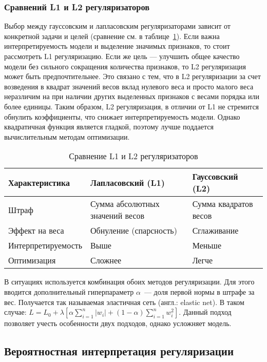 \subsubsection {Сравнений L1 и L2 регуляризаторов}

Выбор между гауссовским и лапласовским регуляризаторами зависит от конкретной задачи и целей (сравнение см. в таблице~\ref{linear-reg-comp}). Если важна интерпретируемость модели и выделение значимых признаков, то стоит рассмотреть L1 регуляризацию. Если же цель — улучшить общее качество модели без сильного сокращения количества признаков, то L2 регуляризация может быть предпочтительнее. Это связано с тем, что в L2 регуляризации за счет возведения в квадрат значений весов вклад нулевого веса и просто малого веса неразличим на при наличии других выделенных признаков с весами порядка или более единицы. Таким образом, L2 регуляризация, в отличии от L1 не стремится обнулить коэффициенты, что снижает интерпретируемость модели. Однако квадратичная функция является гладкой, поэтому лучше поддается вычислительным методам оптимизации.

\begin{table}[ht]
	\caption{Сравнение L1 и L2 регуляризаторов}
	\label{linear-reg-comp}
	\begin{tabular}{l|l|l}
		Характеристика & Лапласовский (L1) & Гауссовский (L2) \\
		\hline
		Штраф & Сумма абсолютных значений весов & Сумма квадратов весов \\
		Эффект на веса & Обнуление (спарсность) & Сглаживание \\
		Интерпретируемость & Выше & Меньше \\
		Оптимизация & Сложнее & Легче
	\end{tabular}
\end{table}

В ситуациях используется комбинация обоих методов регуляризации. Для этого вводится дополнительный гиперпараметр $\alpha$~--- доля первой нормы в штрафе за вес. Получается так называемая эластичная сеть (англ.: elastic net). В таком случае:
$L = L_0 + \lambda [\alpha \sum_{i=1}^{n} |w_i| + (1 - \alpha) \sum_{i=1}^{n} w_i^2]$. Данный подход позволяет учесть особенности двух подходов, однако усложняет модель.

\subsection {Вероятностная интерпретация регуляризации}
\label{linear-reg-prob}

